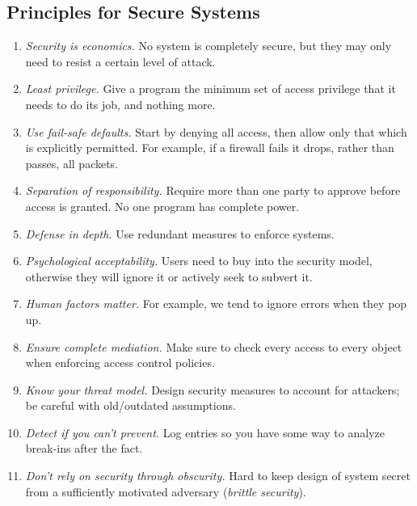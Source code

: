 \documentclass[10pt,landscape]{article}
\begin{document}
\raggedright
\footnotesize
\begin{multicols}{3}

\setlength{\premulticols}{1pt}
\setlength{\postmulticols}{1pt}
\setlength{\multicolsep}{1pt}
\setlength{\columnsep}{2pt}


\section{Principles for Secure Systems}

\begin{enumerate}
    \item \textit{Security is economics.} No system is completely secure, but they may only need to resist a certain level of attack.
    \item \textit{Least privilege.} Give a program the minimum set of access privilege that it needs to do its job, and nothing more.
    \item \textit{Use fail-safe defaults.} Start by denying all access, then allow only that which is explicitly permitted. For example, if a firewall fails it drops, rather than passes, all packets.
    \item \textit{Separation of responsibility.} Require more than one party to approve before access is granted. No one program has complete power.
    \item \textit{Defense in depth.} Use redundant measures to enforce systems.
    \item \textit{Psychological acceptability.} Users need to buy into the security model, otherwise they will ignore it or actively seek to subvert it.
    \item \textit{Human factors matter.} For example, we tend to ignore errors when they pop up.
    \item \textit{Ensure complete mediation.} Make sure to check every access to every object when enforcing access control policies.
    \item \textit{Know your threat model.} Design security measures to account for attackers; be careful with old/outdated assumptions.
    \item \textit{Detect if you can't prevent.} Log entries so you have some way to analyze break-ins after the fact.
    \item \textit{Don't rely on security through obscurity.} Hard to keep design of system secret from a sufficiently motivated adversary (\textit{brittle security}).

\end{enumerate}
\end{multicols}
\end{document}
